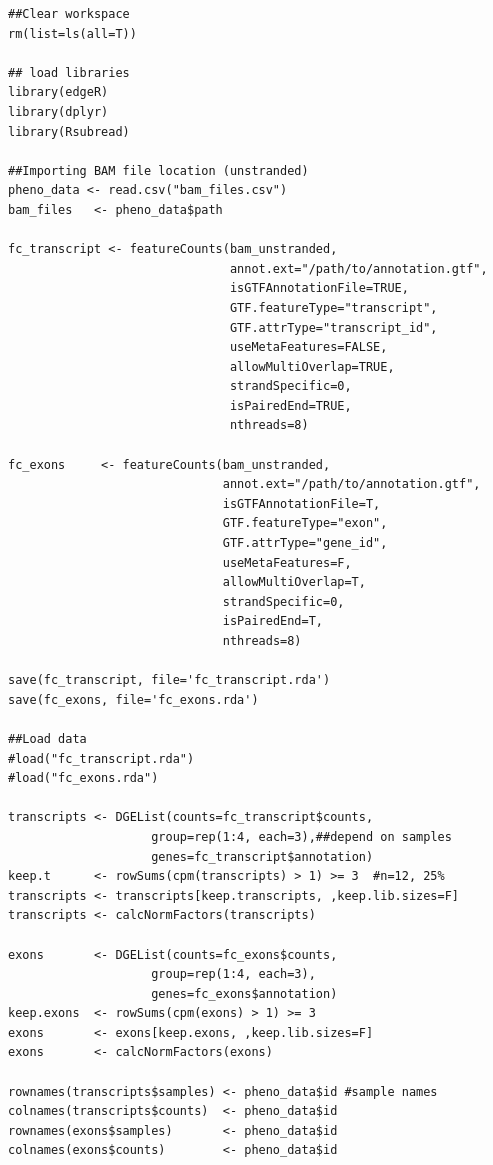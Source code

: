 \begin{verbatim}
##Clear workspace
rm(list=ls(all=T))

## load libraries
library(edgeR)
library(dplyr)
library(Rsubread)

##Importing BAM file location (unstranded)
pheno_data <- read.csv("bam_files.csv")
bam_files   <- pheno_data$path

fc_transcript <- featureCounts(bam_unstranded,
                               annot.ext="/path/to/annotation.gtf",
                               isGTFAnnotationFile=TRUE,
                               GTF.featureType="transcript",
                               GTF.attrType="transcript_id",
                               useMetaFeatures=FALSE,
                               allowMultiOverlap=TRUE,
                               strandSpecific=0,
                               isPairedEnd=TRUE,
                               nthreads=8)

fc_exons     <- featureCounts(bam_unstranded,
                              annot.ext="/path/to/annotation.gtf",
                              isGTFAnnotationFile=T,
                              GTF.featureType="exon",
                              GTF.attrType="gene_id",
                              useMetaFeatures=F,
                              allowMultiOverlap=T,
                              strandSpecific=0,
                              isPairedEnd=T,
                              nthreads=8)

save(fc_transcript, file='fc_transcript.rda')
save(fc_exons, file='fc_exons.rda')

##Load data
#load("fc_transcript.rda")
#load("fc_exons.rda")

transcripts <- DGEList(counts=fc_transcript$counts,
                    group=rep(1:4, each=3),##depend on samples
                    genes=fc_transcript$annotation)
keep.t      <- rowSums(cpm(transcripts) > 1) >= 3  #n=12, 25%
transcripts <- transcripts[keep.transcripts, ,keep.lib.sizes=F]
transcripts <- calcNormFactors(transcripts)

exons       <- DGEList(counts=fc_exons$counts,
                    group=rep(1:4, each=3),
                    genes=fc_exons$annotation)
keep.exons  <- rowSums(cpm(exons) > 1) >= 3
exons       <- exons[keep.exons, ,keep.lib.sizes=F]
exons       <- calcNormFactors(exons)

rownames(transcripts$samples) <- pheno_data$id #sample names
colnames(transcripts$counts)  <- pheno_data$id
rownames(exons$samples)       <- pheno_data$id
colnames(exons$counts)        <- pheno_data$id


\end{verbatim}
